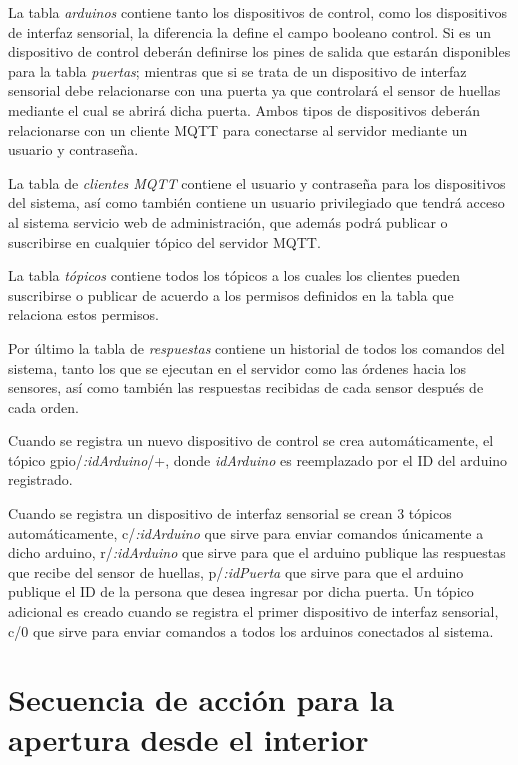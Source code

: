 \documentclass[../principal]{subfiles}
\begin{document}
  La tabla \textit{arduinos} contiene tanto los dispositivos de control, como los dispositivos de interfaz sensorial, la diferencia la define el campo booleano control. Si es un dispositivo de control deberán definirse los pines de salida que estarán disponibles para la tabla \textit{puertas}; mientras que si se trata de un dispositivo de interfaz sensorial debe relacionarse con una puerta ya que controlará el sensor de huellas mediante el cual se abrirá dicha puerta. Ambos tipos de dispositivos deberán relacionarse con un cliente MQTT para conectarse al servidor mediante un usuario y contraseña.
  
  La tabla de \textit{clientes MQTT} contiene el usuario y contraseña para los dispositivos del sistema, así como también contiene un usuario privilegiado que tendrá acceso al sistema servicio web de administración, que además podrá publicar o suscribirse en cualquier tópico del servidor MQTT.

  La tabla \textit{tópicos} contiene todos los tópicos a los cuales los clientes pueden suscribirse o publicar de acuerdo a los permisos definidos en la tabla que relaciona estos permisos.

  Por último la tabla de \textit{respuestas} contiene un historial de todos los comandos del sistema, tanto los que se ejecutan en el servidor como las órdenes hacia los sensores, así como también las respuestas recibidas de cada sensor después de cada orden.

  Cuando se registra un nuevo dispositivo de control se crea automáticamente, el tópico gpio/\textit{:idArduino}/+, donde \textit{idArduino} es reemplazado por el ID del arduino registrado.

  Cuando se registra un dispositivo de interfaz sensorial se crean 3 tópicos automáticamente, c/\textit{:idArduino} que sirve para enviar comandos únicamente a dicho arduino, r/\textit{:idArduino} que sirve para que el arduino publique las respuestas que recibe del sensor de huellas, p/\textit{:idPuerta} que sirve para que el arduino publique el ID de la persona que desea ingresar por dicha puerta. Un tópico adicional es creado cuando se registra el primer dispositivo de interfaz sensorial, c/0 que sirve para enviar comandos a todos los arduinos conectados al sistema.

  \section{Secuencia de acción para la apertura desde el interior}
\end{document}
